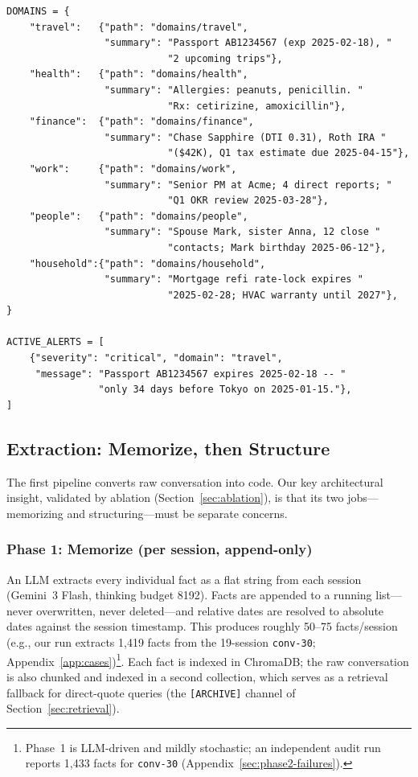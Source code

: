 \begin{lstlisting}[caption={The manifest, always loaded into the agent's context. \texttt{ACTIVE\_ALERTS} is overwritten by the constraint runner; the agent surfaces them proactively without retrieval.}, label={lst:manifest}]
DOMAINS = {
    "travel":   {"path": "domains/travel",
                 "summary": "Passport AB1234567 (exp 2025-02-18), "
                            "2 upcoming trips"},
    "health":   {"path": "domains/health",
                 "summary": "Allergies: peanuts, penicillin. "
                            "Rx: cetirizine, amoxicillin"},
    "finance":  {"path": "domains/finance",
                 "summary": "Chase Sapphire (DTI 0.31), Roth IRA "
                            "($42K), Q1 tax estimate due 2025-04-15"},
    "work":     {"path": "domains/work",
                 "summary": "Senior PM at Acme; 4 direct reports; "
                            "Q1 OKR review 2025-03-28"},
    "people":   {"path": "domains/people",
                 "summary": "Spouse Mark, sister Anna, 12 close "
                            "contacts; Mark birthday 2025-06-12"},
    "household":{"path": "domains/household",
                 "summary": "Mortgage refi rate-lock expires "
                            "2025-02-28; HVAC warranty until 2027"},
}

ACTIVE_ALERTS = [
    {"severity": "critical", "domain": "travel",
     "message": "Passport AB1234567 expires 2025-02-18 -- "
                "only 34 days before Tokyo on 2025-01-15."},
]
\end{lstlisting}

\subsection{Extraction: Memorize, then Structure}
\label{sec:extraction}

The first pipeline converts raw conversation into code. Our key architectural insight, validated by ablation (Section~\ref{sec:ablation}), is that its two jobs---memorizing and structuring---must be separate concerns.

\subsubsection{Phase 1: Memorize (per session, append-only)}

An LLM extracts every individual fact as a flat string from each session (Gemini~3 Flash, thinking budget 8192). Facts are appended to a running list---never overwritten, never deleted---and relative dates are resolved to absolute dates against the session timestamp. This produces roughly 50--75 facts/session (e.g., our run extracts 1{,}419 facts from the 19-session \texttt{conv-30}; Appendix~\ref{app:cases})\footnote{Phase~1 is LLM-driven and mildly stochastic; an independent audit run reports 1{,}433 facts for \texttt{conv-30} (Appendix~\ref{sec:phase2-failures}).}. Each fact is indexed in ChromaDB; the raw conversation is also chunked and indexed in a second collection, which serves as a retrieval fallback for direct-quote queries (the \texttt{[ARCHIVE]} channel of Section~\ref{sec:retrieval}).

